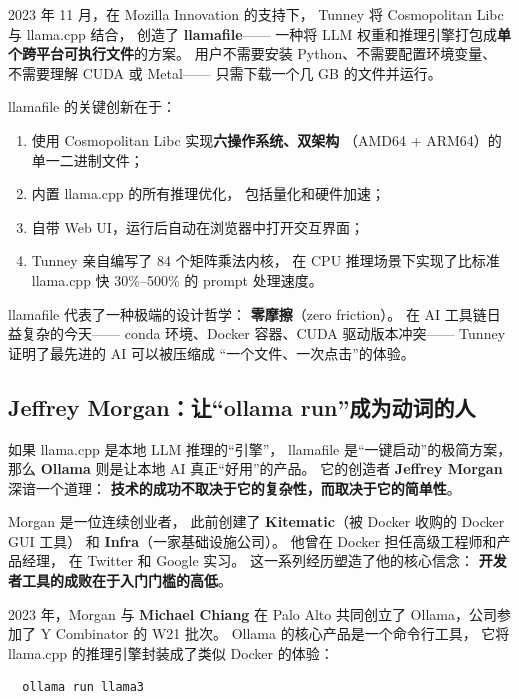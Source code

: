 2023 年 11 月，在 Mozilla Innovation 的支持下，
Tunney 将 Cosmopolitan Libc 与 llama.cpp 结合，
创造了 \textbf{llamafile}——
一种将 LLM 权重和推理引擎打包成\textbf{单个跨平台可执行文件}的方案。
用户不需要安装 Python、不需要配置环境变量、
不需要理解 CUDA 或 Metal——
只需下载一个几 GB 的文件并运行。

\begin{keybox}
llamafile 的关键创新在于：
\begin{enumerate}[noitemsep]
  \item 使用 Cosmopolitan Libc 实现\textbf{六操作系统、双架构}
    （AMD64 + ARM64）的单一二进制文件；
  \item 内置 llama.cpp 的所有推理优化，
    包括量化和硬件加速；
  \item 自带 Web UI，运行后自动在浏览器中打开交互界面；
  \item Tunney 亲自编写了 84 个矩阵乘法内核，
    在 CPU 推理场景下实现了比标准 llama.cpp
    快 30\%--500\% 的 prompt 处理速度。
\end{enumerate}
\end{keybox}

llamafile 代表了一种极端的设计哲学：
\textbf{零摩擦}（zero friction）。
在 AI 工具链日益复杂的今天——
conda 环境、Docker 容器、CUDA 驱动版本冲突——
Tunney 证明了最先进的 AI 可以被压缩成
``一个文件、一次点击''的体验。


\subsection{Jeffrey Morgan：让``ollama run''成为动词的人}
\label{subsec:morgan}

如果 llama.cpp 是本地 LLM 推理的``引擎''，
llamafile 是``一键启动''的极简方案，
那么 \textbf{Ollama} 则是让本地 AI 真正``好用''的产品。
它的创造者 \textbf{Jeffrey Morgan} 深谙一个道理：
\textbf{技术的成功不取决于它的复杂性，而取决于它的简单性}。

Morgan 是一位连续创业者，
此前创建了 \textbf{Kitematic}（被 Docker 收购的 Docker GUI 工具）
和 \textbf{Infra}（一家基础设施公司）。
他曾在 Docker 担任高级工程师和产品经理，
在 Twitter 和 Google 实习。
这一系列经历塑造了他的核心信念：
\textbf{开发者工具的成败在于入门门槛的高低}。

2023 年，Morgan 与 \textbf{Michael Chiang} 在 Palo Alto
共同创立了 Ollama，公司参加了 Y Combinator 的 W21 批次。
Ollama 的核心产品是一个命令行工具，
它将 llama.cpp 的推理引擎封装成了类似 Docker 的体验：

\begin{verbatim}
  ollama run llama3
\end{verbatim}

